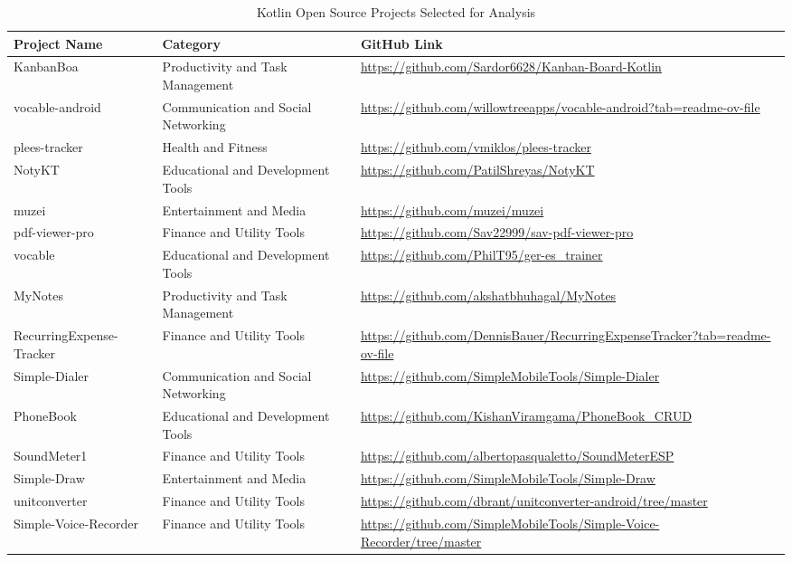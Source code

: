 \begin{table}[htbp]
	\begin{tabular}{p{3cm}|p{5cm}|p{7cm}}
		\hline
		\cellcolor{Gray}Project Name & \cellcolor{Gray}Category & \cellcolor{Gray}GitHub Link  \\ \hline
        KanbanBoa & Productivity and Task Management & \url{https://github.com/Sardor6628/Kanban-Board-Kotlin} \\
        vocable-android & Communication and Social Networking & \url{https://github.com/willowtreeapps/vocable-android?tab=readme-ov-file} \\
        plees-tracker & Health and Fitness & \url{https://github.com/vmiklos/plees-tracker} \\
        NotyKT & Educational and Development Tools & \url{https://github.com/PatilShreyas/NotyKT} \\
        muzei & Entertainment and Media & \url{https://github.com/muzei/muzei} \\
        pdf-viewer-pro & Finance and Utility Tools & \url{https://github.com/Sav22999/sav-pdf-viewer-pro} \\
        vocable & Educational and Development Tools & \url{https://github.com/PhilT95/ger-es_trainer} \\
        MyNotes & Productivity and Task Management & \url{https://github.com/akshatbhuhagal/MyNotes} \\
        RecurringExpense-Tracker & Finance and Utility Tools & \url{https://github.com/DennisBauer/RecurringExpenseTracker?tab=readme-ov-file} \\
        Simple-Dialer & Communication and Social Networking & \url{https://github.com/SimpleMobileTools/Simple-Dialer} \\
        PhoneBook & Educational and Development Tools & \url{https://github.com/KishanViramgama/PhoneBook_CRUD} \\
        SoundMeter1 & Finance and Utility Tools & \url{https://github.com/albertopasqualetto/SoundMeterESP} \\
        Simple-Draw & Entertainment and Media & \url{https://github.com/SimpleMobileTools/Simple-Draw} \\
        unitconverter & Finance and Utility Tools & \url{https://github.com/dbrant/unitconverter-android/tree/master} \\
        Simple-Voice-Recorder & Finance and Utility Tools & \url{https://github.com/SimpleMobileTools/Simple-Voice-Recorder/tree/master} \\
    \end{tabular}
	\caption{ Kotlin Open Source Projects Selected for Analysis \label{tab:kotlin_projects}}
\end{table}


